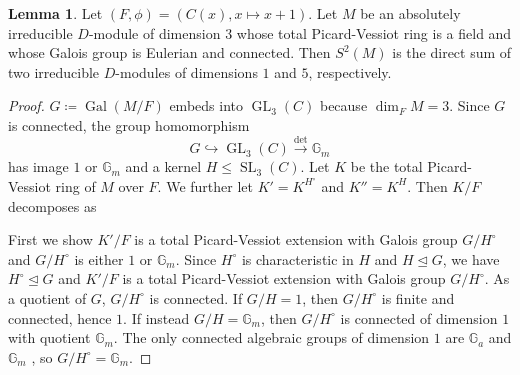 \documentclass[11pt,reqno]{amsart}
\theoremstyle{definition}
\newtheorem{lemma}[theorem]{Lemma}
\DeclareMathOperator{\SL}{SL}
\DeclareMathOperator{\GL}{GL}
\DeclareMathOperator{\Gal}{Gal}
\begin{document}
\begin{lemma}
\label{lemma:first-classification}
    Let $(F,\phi)=(C (x),x\mapsto x+1)$. 
    Let $M$ be an absolutely irreducible $D$-module of dimension $3$ whose total Picard-Vessiot ring is a field and whose Galois group is Eulerian and connected. 
    Then $S^2(M)$ is the direct sum of two irreducible $D$-modules of dimensions $1$ and $5$, respectively.
\end{lemma}
\begin{proof}
$G\coloneqq \Gal(M/F)$ embeds into $\GL_3(C)$ because $\dim_{F} M=3$.
Since $G$ is connected, the group homomorphism 
\[
    G\hookrightarrow \GL_{3}(C)\xrightarrow{\det} \mathbb{G}_{m}
\]
has image $1$ or $\mathbb G_m$ and a kernel $H\le \SL_{3}(C)$.
Let $K$ be the total Picard-Vessiot ring of $M$ over $F$. We further let $K'= K^{H^{\circ}}$ and $K''= K^{H}$.
Then $K/F$ decomposes as
\begin{center}
\end{center}

First we show $K'/F$ is a total Picard-Vessiot extension with Galois group $G/H^{\circ}$ and $G/H^{\circ}$ is either $1$ or $\mathbb{G}_{m}$.
Since $H^{\circ}$ is characteristic in $H$ and $H\trianglelefteq G$, we have $H^{\circ}\trianglelefteq G$ and $K'/F$ is a total Picard-Vessiot extension with Galois group $G/H^{\circ}$. As a quotient of $G$, $G/H^{\circ}$ is connected. 
If $G/H=1$, then $G/H^{\circ}$ is finite and connected, hence $1$. 
If instead $G/H= \mathbb{G}_{m}$, then $G/H^{\circ}$ is connected of dimension $1$ with quotient $\mathbb{G}_{m}$. 
The only connected algebraic groups of dimension $1$ are $\mathbb{G}_{a}$ and $\mathbb{G}_{m}$ \cite[Theorem 3.4.9]{springer1998linear}, so $G/H^{\circ}= \mathbb{G}_{m}$.


\end{proof}
\end{document}
